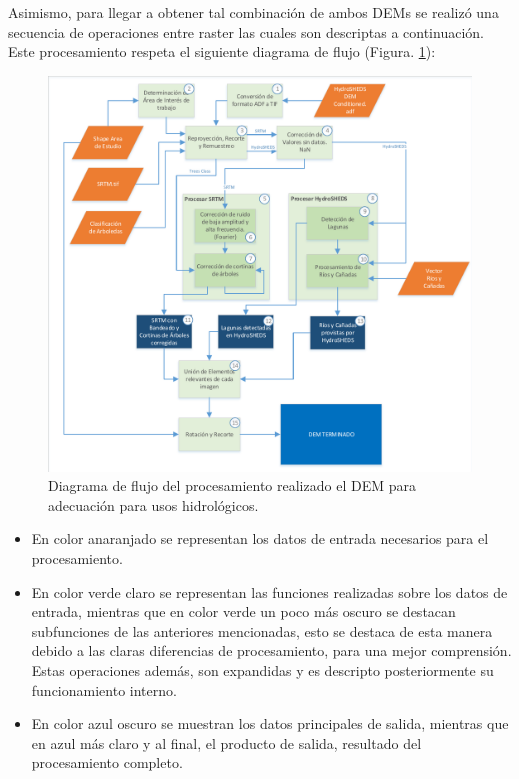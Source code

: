 \documentclass[10pt,a4paper, twoside]{report}
\begin{document}
Asimismo, para llegar a obtener tal combinación de ambos DEMs se realizó una secuencia de operaciones entre raster las cuales son descriptas a continuación. Este procesamiento respeta el siguiente diagrama de flujo (Figura. \ref{FlowCompleto}):

\begin{figure}[!htb]
   \centering      
   \includegraphics[width=1.0\textwidth]{imagenes/FlowChartsCompleto.pdf}
 \caption{Diagrama de flujo del procesamiento realizado el DEM para adecuación para usos hidrológicos.}
 \label{FlowCompleto}
\end{figure}


\begin{itemize}
	\item En color anaranjado se representan los datos de entrada necesarios para el procesamiento.
	\item En color verde claro se representan las funciones realizadas sobre los datos de entrada, mientras que en color verde un poco más oscuro se destacan subfunciones de las anteriores mencionadas, esto se destaca de esta manera debido a las claras diferencias de procesamiento, para una mejor comprensión. Estas operaciones además, son expandidas y es descripto posteriormente su funcionamiento interno. 
	\item En color azul oscuro se muestran los datos principales de salida, mientras que en azul más claro y al final, el producto de salida, resultado del procesamiento completo.
\end{itemize}
\end{document}
